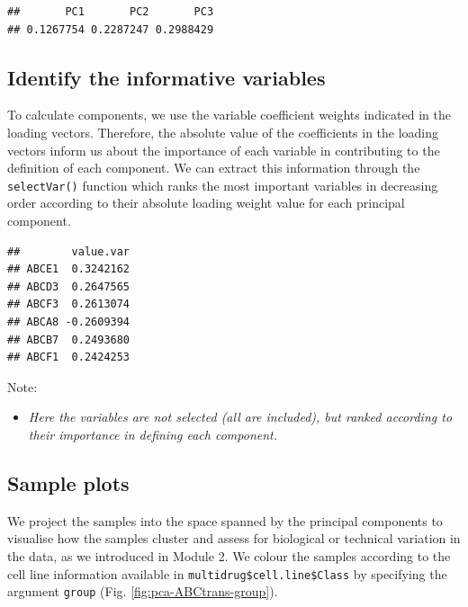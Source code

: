 \documentclass[]{book}
\newenvironment{Shaded}{\begin{snugshade}}{\end{snugshade}}
\newcommand{\KeywordTok}[1]{\textcolor[rgb]{0.13,0.29,0.53}{\textbf{#1}}}
\newcommand{\DataTypeTok}[1]{\textcolor[rgb]{0.13,0.29,0.53}{#1}}
\newcommand{\DecValTok}[1]{\textcolor[rgb]{0.00,0.00,0.81}{#1}}
\newcommand{\CommentTok}[1]{\textcolor[rgb]{0.56,0.35,0.01}{\textit{#1}}}
\newcommand{\OperatorTok}[1]{\textcolor[rgb]{0.81,0.36,0.00}{\textbf{#1}}}
\newcommand{\NormalTok}[1]{#1}
\providecommand{\tightlist}{%
  \setlength{\itemsep}{0pt}\setlength{\parskip}{0pt}}
\begin{document}
\begin{verbatim}
##       PC1       PC2       PC3 
## 0.1267754 0.2287247 0.2988429
\end{verbatim}

\subsection{Identify the informative
variables}\label{identify-the-informative-variables}

To calculate components, we use the variable coefficient weights
indicated in the loading vectors. Therefore, the absolute value of the
coefficients in the loading vectors inform us about the importance of
each variable in contributing to the definition of each component. We
can extract this information through the \texttt{selectVar()} function
which ranks the most important variables in decreasing order according
to their absolute loading weight value for each principal component.

\begin{Shaded}
\end{Shaded}

\begin{verbatim}
##        value.var
## ABCE1  0.3242162
## ABCD3  0.2647565
## ABCF3  0.2613074
## ABCA8 -0.2609394
## ABCB7  0.2493680
## ABCF1  0.2424253
\end{verbatim}

Note:

\begin{itemize}
\tightlist
\item
  \emph{Here the variables are not selected (all are included), but
  ranked according to their importance in defining each component.}
\end{itemize}

\subsection{Sample plots}\label{meth-PCA-sample}

We project the samples into the space spanned by the principal
components to visualise how the samples cluster and assess for
biological or technical variation in the data, as we introduced in
Module 2. We colour the samples according to the cell line information
available in \texttt{multidrug\$cell.line\$Class} by specifying the
argument \texttt{group} (Fig. \ref{fig:pca-ABCtrans-group}).
\end{document}
